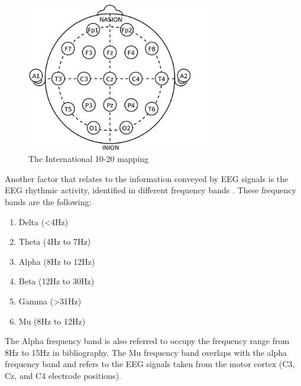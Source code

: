 \begin{figure}
	\centering
	\includegraphics[width=8cm]{Figures/Brain_I20.jpg} %
	\caption{The International 10-20 mapping} %
	\label{I20map} %
\end{figure}



Another factor that relates to the information conveyed by EEG signals is the EEG rhythmic activity, identified in different frequency bands \citep{Fink2014}. These frequency bands are the following:

\begin{enumerate} [label=\alph*)]
	\item Delta (<4Hz) 
	\item Theta (4Hz to 7Hz)
	\item Alpha (8Hz to 12Hz) 
	\item Beta (12Hz to 30Hz)
	\item Gamma (>31Hz)
	\item Mu (8Hz to 12Hz)  
\end{enumerate} 

The Alpha frequency band is also referred to occupy the frequency range from 8Hz to 15Hz in bibliography. The Mu frequency band overlaps with the alpha frequency band and refers to the EEG signals taken from the motor cortex (C3, Cz, and C4 electrode positions).  


